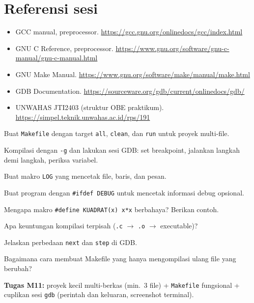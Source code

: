 \documentclass[../main.tex]{subfiles}
\begin{document}
\section{Referensi sesi}
\begin{itemize}[leftmargin=*]
  \item GCC manual, preprocessor. \url{https://gcc.gnu.org/onlinedocs/gcc/index.html}
  \item GNU C Reference, preprocessor. \url{https://www.gnu.org/software/gnu-c-manual/gnu-c-manual.html}
  \item GNU Make Manual. \url{https://www.gnu.org/software/make/manual/make.html}
  \item GDB Documentation. \url{https://sourceware.org/gdb/current/onlinedocs/gdb/}
  \item UNWAHAS JTI2403 (struktur OBE praktikum). \url{https://simpel.teknik.unwahas.ac.id/rps/191}
\end{itemize}

\begin{aktivitas}
  \item Buat \texttt{Makefile} dengan target \texttt{all}, \texttt{clean}, dan \texttt{run} untuk proyek multi-file.
  \item Kompilasi dengan \texttt{-g} dan lakukan sesi GDB: set breakpoint, jalankan langkah demi langkah, periksa variabel.
  \item Buat makro \texttt{LOG} yang mencetak file, baris, dan pesan.
  \item Buat program dengan \texttt{\#ifdef DEBUG} untuk mencetak informasi debug opsional.
\end{aktivitas}

\begin{latihan}
  \item Mengapa makro \texttt{\#define KUADRAT(x) x*x} berbahaya? Berikan contoh.
  \item Apa keuntungan kompilasi terpisah (\texttt{.c} $\rightarrow$ \texttt{.o} $\rightarrow$ executable)?
  \item Jelaskan perbedaan \texttt{next} dan \texttt{step} di GDB.
  \item Bagaimana cara membuat Makefile yang hanya mengompilasi ulang file yang berubah?
\end{latihan}

\begin{asesmen}
\textbf{Tugas M11:} proyek kecil multi-berkas (min.\ 3 file) + \texttt{Makefile} fungsional + cuplikan sesi \texttt{gdb} (perintah dan keluaran, screenshot terminal).
\end{asesmen}
\end{document}
